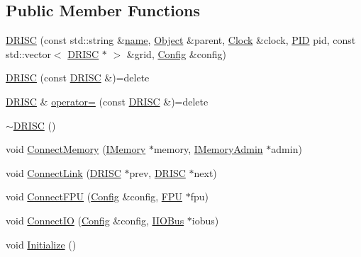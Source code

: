 \subsection*{Public Member Functions}
\begin{DoxyCompactItemize}
\item 
\hyperlink{class_simulator_1_1_d_r_i_s_c_adb62a9c8ee9adefdef8862c284ebccce}{D\+R\+I\+S\+C} (const std\+::string \&\hyperlink{mtconf_8c_a8f8f80d37794cde9472343e4487ba3eb}{name}, \hyperlink{class_simulator_1_1_object}{Object} \&parent, \hyperlink{class_simulator_1_1_clock}{Clock} \&clock, \hyperlink{namespace_simulator_aa671021151c047ae2da6dce4e6303476}{P\+I\+D} pid, const std\+::vector$<$ \hyperlink{class_simulator_1_1_d_r_i_s_c}{D\+R\+I\+S\+C} $\ast$ $>$ \&grid, \hyperlink{class_config}{Config} \&config)
\item 
\hyperlink{class_simulator_1_1_d_r_i_s_c_a43ea7e6f231e9c35c8080e9f18a0d336}{D\+R\+I\+S\+C} (const \hyperlink{class_simulator_1_1_d_r_i_s_c}{D\+R\+I\+S\+C} \&)=delete
\item 
\hyperlink{class_simulator_1_1_d_r_i_s_c}{D\+R\+I\+S\+C} \& \hyperlink{class_simulator_1_1_d_r_i_s_c_a2f371d61c6314c119d66093f183b71fb}{operator=} (const \hyperlink{class_simulator_1_1_d_r_i_s_c}{D\+R\+I\+S\+C} \&)=delete
\item 
\hyperlink{class_simulator_1_1_d_r_i_s_c_ab661fc4050b4b0ef557f960234858f98}{$\sim$\+D\+R\+I\+S\+C} ()
\item 
void \hyperlink{class_simulator_1_1_d_r_i_s_c_a2cd106e8cad6afd3ba7d31ac40697e71}{Connect\+Memory} (\hyperlink{class_simulator_1_1_i_memory}{I\+Memory} $\ast$memory, \hyperlink{class_simulator_1_1_i_memory_admin}{I\+Memory\+Admin} $\ast$admin)
\item 
void \hyperlink{class_simulator_1_1_d_r_i_s_c_a1c608aa906b8277562aa21f2b9f7bebc}{Connect\+Link} (\hyperlink{class_simulator_1_1_d_r_i_s_c}{D\+R\+I\+S\+C} $\ast$prev, \hyperlink{class_simulator_1_1_d_r_i_s_c}{D\+R\+I\+S\+C} $\ast$next)
\item 
void \hyperlink{class_simulator_1_1_d_r_i_s_c_a643dc8cf598b263ee4a698330ae8a9b8}{Connect\+F\+P\+U} (\hyperlink{class_config}{Config} \&config, \hyperlink{class_simulator_1_1_f_p_u}{F\+P\+U} $\ast$fpu)
\item 
void \hyperlink{class_simulator_1_1_d_r_i_s_c_ac023555a197b90d26052d062162d781e}{Connect\+I\+O} (\hyperlink{class_config}{Config} \&config, \hyperlink{class_simulator_1_1_i_i_o_bus}{I\+I\+O\+Bus} $\ast$iobus)
\item 
void \hyperlink{class_simulator_1_1_d_r_i_s_c_ab1448ca955dda9eda2ad3d84a5d24918}{Initialize} ()

\end{DoxyCompactItemize}
